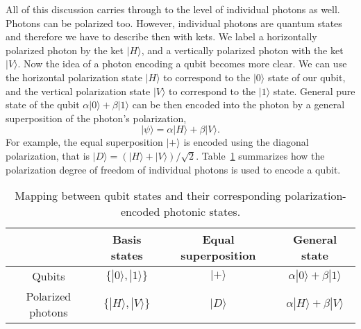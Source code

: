 All of this discussion carries through to the level of individual photons as well.
Photons can be polarized too.
However, individual photons are quantum states and therefore we have to describe then with kets.
We label a horizontally polarized photon by the ket $|H\rangle$, and a vertically polarized photon with the ket $|V\rangle$.
Now the idea of a photon encoding a qubit becomes more clear.
We can use the horizontal polarization state $|H\rangle$ to correspond to the $|0\rangle$ state of our qubit, and the vertical polarization state $|V\rangle$ to correspond to the $|1\rangle$ state.
General pure state of the qubit $\alpha|0\rangle+\beta|1\rangle$ can be then encoded into the photon by a general superposition of the photon's polarization,
\begin{equation}
    |\psi\rangle = \alpha|H\rangle + \beta|V\rangle.
\end{equation}
For example, the equal superposition $|+\rangle$ is encoded using the diagonal polarization, that is $|D\rangle=(|H\rangle+|V\rangle)/\sqrt{2}$.
Table~\ref{tab:4-4_polarization_encoding} summarizes how the polarization degree of freedom of individual photons is used to encode a qubit.
\begin{table}[h]
    \setcellgapes{5pt}
    \renewcommand\theadfont{}
    \makegapedcells
    \centering
    \begin{tabular}{cccc}
        \hline
         & \textbf{Basis states} & \textbf{Equal superposition} & \textbf{General state} \\
        \hline
        Qubits & $\{|0\rangle,|1\rangle\}$ & $|+\rangle$ & $\alpha|0\rangle+\beta|1\rangle$ \\
        Polarized photons & $\{|H\rangle,|V\rangle\}$ & $|D\rangle$ & $\alpha|H\rangle+\beta|V\rangle$ \\
        \hline
    \end{tabular}
    \caption[Polarization encoding.]{Mapping between qubit states and their corresponding polarization-encoded photonic states.}
    \label{tab:4-4_polarization_encoding}
\end{table}

